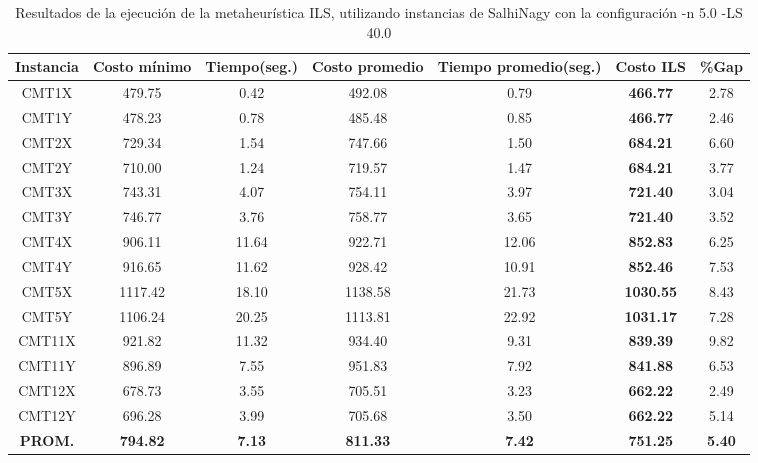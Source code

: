 \begin{table}[ht]
\caption{Resultados de la ejecución de la metaheurística ILS, utilizando instancias de SalhiNagy con la configuración -n 5.0 -LS 40.0}
\centering
\small
\begin{tabular}{c c c c c c c}
\hline\hline
Instancia & Costo mínimo & Tiempo(seg.) & Costo promedio & Tiempo promedio(seg.) & Costo ILS & \%Gap \\ [0.5ex]
\hline
CMT1X & 479.75 & 0.42 & 
492.08 & 0.79 & \bf{466.77} & 
2.78\\CMT1Y & 478.23 & 0.78 & 
485.48 & 0.85 & \bf{466.77} & 
2.46\\CMT2X & 729.34 & 1.54 & 
747.66 & 1.50 & \bf{684.21} & 
6.60\\CMT2Y & 710.00 & 1.24 & 
719.57 & 1.47 & \bf{684.21} & 
3.77\\CMT3X & 743.31 & 4.07 & 
754.11 & 3.97 & \bf{721.40} & 
3.04\\CMT3Y & 746.77 & 3.76 & 
758.77 & 3.65 & \bf{721.40} & 
3.52\\CMT4X & 906.11 & 11.64 & 
922.71 & 12.06 & \bf{852.83} & 
6.25\\CMT4Y & 916.65 & 11.62 & 
928.42 & 10.91 & \bf{852.46} & 
7.53\\CMT5X & 1117.42 & 18.10 & 
1138.58 & 21.73 & \bf{1030.55} & 
8.43\\CMT5Y & 1106.24 & 20.25 & 
1113.81 & 22.92 & \bf{1031.17} & 
7.28\\CMT11X & 921.82 & 11.32 & 
934.40 & 9.31 & \bf{839.39} & 
9.82\\CMT11Y & 896.89 & 7.55 & 
951.83 & 7.92 & \bf{841.88} & 
6.53\\CMT12X & 678.73 & 3.55 & 
705.51 & 3.23 & \bf{662.22} & 
2.49\\CMT12Y & 696.28 & 3.99 & 
705.68 & 3.50 & \bf{662.22} & 
5.14\\\bf{PROM.} & 
\bf{794.82} & \bf{7.13} & \bf{811.33} & \bf{7.42} & \bf{751.25} & \bf{5.40}\\[1ex]\hline
\end{tabular}
\label{table:nonlin}
\end{table} \clearpage
